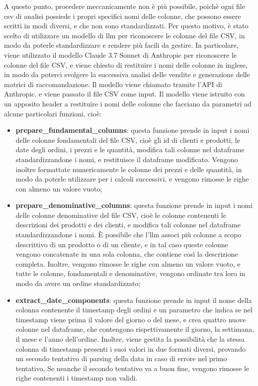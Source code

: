 A questo punto, procedere meccanicamente non è più possibile, poichè ogni file csv di analisi possiede i propri specifici nomi delle colonne, che possono essere scritti in modi diversi, e che non sono standardizzati. Per questo motivo, è stato scelto di utilizzare un modello di \gls{llm} per riconoscere le colonne del file CSV, in modo da poterle standardizzare e rendere più facili da gestire. In particolare, viene utilizzato il modello Claude 3.7 Sonnet di Anthropic per riconoscere le colonne del file CSV, e viene chiesto di restituire i nomi delle colonne in inglese, in modo da poterci svolgere la successiva analisi delle vendite e generazione delle matrici di raccomandazione. Il modello viene chiamato tramite l'API di Anthropic, e viene passato il file CSV come input. Il modello viene istruito con un apposito header a restituire i nomi delle colonne che facciano da parametri ad alcune particolari funzioni, cioè:
\begin{itemize}
    \item \textbf{prepare\_fundamental\_columns}: questa funzione prende in input i nomi delle colonne fondamentali del file CSV, cioè gli id di clienti e prodotti, le date degli ordini, i prezzi e le quantità, modifica tali colonne nel dataframe standardizzandone i nomi, e restituisce il dataframe modificato. Vengono inoltre formattate numericamente le colonne dei prezzi e delle quantità, in modo da poterle utilizzare per i calcoli successivi, e vengono rimosse le righe con almeno un valore vuoto;
    \item \textbf{prepare\_denominative\_columns}: questa funzione prende in input i nomi delle colonne denominative del file CSV, cioè le colonne contenenti le descrizioni dei prodotti e dei clienti, e modifica tali colonne nel dataframe standardizzandone i nomi. È possibile che l'\gls{llm} associ più colonne a scopo descrittivo di un prodotto o di un cliente, e in tal caso queste colonne vengono concatenate in una sola colonna, che contiene così la descrizione completa. Inoltre, vengono rimosse le righe con almeno un valore vuoto, e tutte le colonne, fondamentali e denominative, vengono ordinate tra loro in modo da avere un ordine standardizzato;
    \item \textbf{extract\_date\_components}: questa funzione prende in input il nome della colonna contenente il timestamp degli ordini e un parametro che indica se nel timestamp viene prima il valore del giorno o del mese, e crea quattro nuove colonne nel dataframe, che contengono rispettivamente il giorno, la settimana, il mese e l'anno dell'ordine. Inoltre, viene gestita la possibilità che la stessa colonna di timestamp presenti i suoi valori in due formati diversi, provando un secondo tentativo di parsing della data in caso di errore nel primo tentativo. Se neanche il secondo tentativo va a buon fine, vengono rimosse le righe contenenti i timestamp non validi.
\end{itemize}

